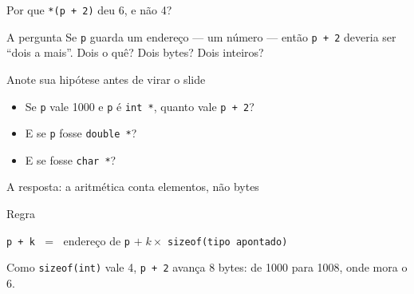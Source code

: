 \documentclass[aspectratio=169]{beamer}
\begin{document}
\begin{frame}{Por que \texttt{*(p + 2)} deu 6, e não 4?}
  \begin{block}{A pergunta}
    Se \texttt{p} guarda um endereço --- um número --- então \texttt{p + 2}
    deveria ser ``dois a mais''. Dois o quê? Dois bytes? Dois inteiros?
  \end{block}
  \begin{exampleblock}{Anote sua hipótese antes de virar o slide}
    \begin{itemize}
      \item Se \texttt{p} vale 1000 e \texttt{p} é \texttt{int *}, quanto vale \texttt{p + 2}?
      \item E se \texttt{p} fosse \texttt{double *}?
      \item E se fosse \texttt{char *}?
    \end{itemize}
  \end{exampleblock}
\end{frame}

\begin{frame}{A resposta: a aritmética conta elementos, não bytes}
  \begin{center}
  \end{center}
  \begin{block}{Regra}
    \begin{center}
      \texttt{p + k} $\;=\;$ endereço de \texttt{p} $+\;k \times$ \texttt{sizeof(tipo apontado)}
    \end{center}
    Como \texttt{sizeof(int)} vale 4, \texttt{p + 2} avança 8 bytes: de 1000
    para 1008, onde mora o 6.
  \end{block}
\end{frame}
\end{document}

